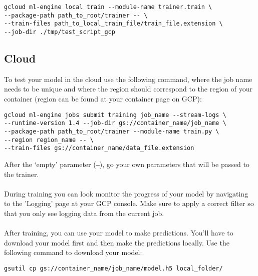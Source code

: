 \documentclass{article}
\begin{document}
\begin{verbatim}
gcloud ml-engine local train --module-name trainer.train \ 
--package-path path_to_root/trainer -- \
--train-files path_to_local_train_file/train_file.extension \
--job-dir ./tmp/test_script_gcp
\end{verbatim}


\subsection{Cloud}
To test your model in the cloud use the following command, where the job name needs to be unique and where the region should correspond to the region of your container (region can be found at your container page on GCP):
\begin{verbatim}
gcloud ml-engine jobs submit training job_name --stream-logs \
--runtime-version 1.4 --job-dir gs://container_name/job_name \
--package-path path_to_root/trainer --module-name train.py \
--region region_name -- \
--train-files gs://container_name/data_file.extension
\end{verbatim}
After the `empty' parameter (\texttt{--}), go your own parameters that will be passed to the trainer. \\
\\
During training you can look monitor the progress of your model by navigating to the 'Logging' page at your GCP console. Make sure to apply a correct filter so that you only see logging data from the current job.
\\
\\
After training, you can use your model to make predictions. You'll have to download your model first and then make the predictions locally. Use the following command to download your model:
\begin{verbatim}
gsutil cp gs://container_name/job_name/model.h5 local_folder/
\end{verbatim}
\end{document}
